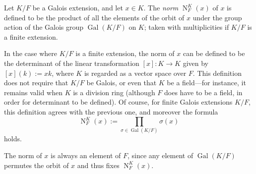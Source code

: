 \documentclass[12pt]{article}
\begin{document}
Let $K/F$ be a Galois extension, and let $x \in K$. The {\em norm} $\operatorname{N}_F^K(x)$ of $x$ is defined to be the product of all the elements of the orbit of $x$ under the group action of the Galois group $\operatorname{Gal}(K/F)$ on $K$; taken with multiplicities if $K/F$ is a finite extension.

In the case where $K/F$ is a finite extension, the norm of $x$ can be defined to be the determinant of the linear transformation $[x]: K \to K$ given by $[x](k) := xk$, where $K$ is regarded as a vector space over $F$. This definition does not require that $K/F$ be Galois, or even that $K$ be a field---for instance, it remains valid when $K$ is a division ring (although $F$ does have to be a field, in order for determinant to be defined). Of course, for finite Galois extensions $K/F$, this definition agrees with the previous one, and moreover the formula
$$
\operatorname{N}_F^K(x) := \prod_{\sigma \in \operatorname{Gal}(K/F)} \sigma(x)
$$
holds.

The norm of $x$ is always an element of $F$, since any element of $\operatorname{Gal}(K/F)$ permutes the orbit of $x$ and thus fixes $\operatorname{N}_F^K(x)$.
\end{document}
